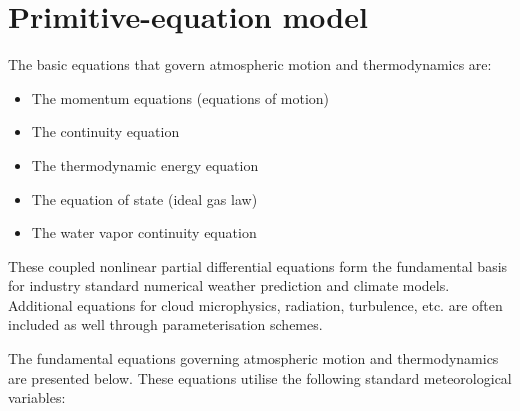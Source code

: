\documentclass{article}
\begin{document}
\section{Primitive-equation model}

The basic equations that govern atmospheric motion and thermodynamics are:

\begin{itemize}
    \item The momentum equations (equations of motion)
    \item The continuity equation 
    \item The thermodynamic energy equation
    \item The equation of state (ideal gas law)
    \item The water vapor continuity equation
\end{itemize}

These coupled nonlinear partial differential equations form the fundamental basis for industry standard numerical weather prediction and climate models. Additional equations for cloud microphysics, radiation, turbulence, etc.  are often included as well through parameterisation schemes.

The fundamental equations governing atmospheric motion and thermodynamics are presented below. These equations utilise the following standard meteorological variables:
\end{document}
